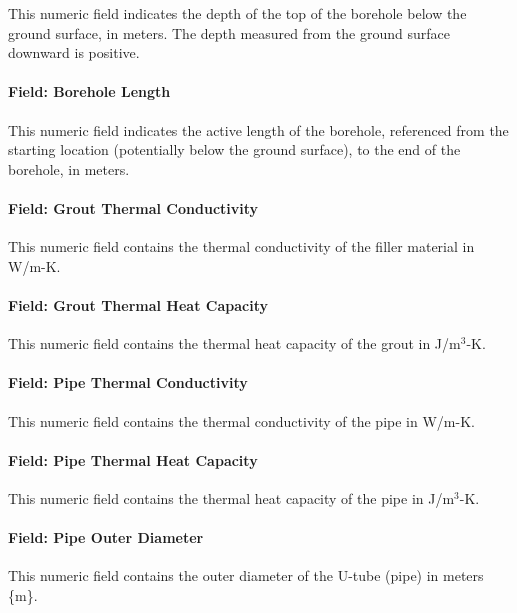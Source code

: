 This numeric field indicates the depth of the top of the borehole below the ground surface, in meters. The depth measured from the ground surface downward is positive.

\paragraph{Field: Borehole Length}

This numeric field indicates the active length of the borehole, referenced from the starting location (potentially below the ground surface), to the end of the borehole, in meters.

\paragraph{Field: Grout Thermal Conductivity}\label{field-grout-thermal-conductivity}

This numeric field contains the thermal conductivity of the filler material in W/m-K.

\paragraph{Field: Grout Thermal Heat Capacity}

This numeric field contains the thermal heat capacity of the grout in J/m\(^{3}\)-K.

\paragraph{Field: Pipe Thermal Conductivity}\label{field-pipe-thermal-conductivity-000}

This numeric field contains the thermal conductivity of the pipe in W/m-K.

\paragraph{Field: Pipe Thermal Heat Capacity}

This numeric field contains the thermal heat capacity of the pipe in J/m\(^{3}\)-K.

\paragraph{Field: Pipe Outer Diameter}\label{field-pipe-out-diameter}

This numeric field contains the outer diameter of the U-tube (pipe) in meters \{m\}.

